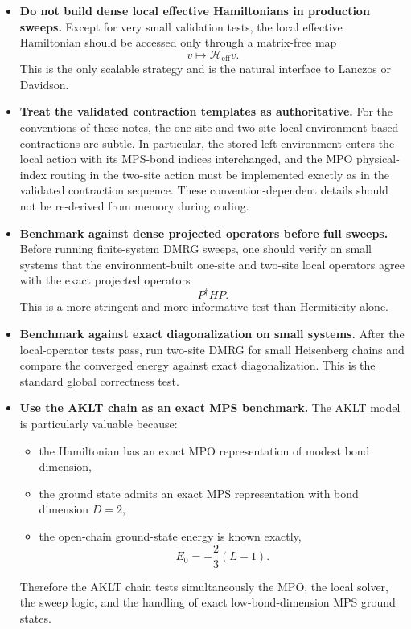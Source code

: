 \documentclass[aps,prb,onecolumn,nofootinbib]{revtex4-2}
\begin{document}
\begin{itemize}
		\item \textbf{Do not build dense local effective Hamiltonians in production sweeps.}
		Except for very small validation tests, the local effective Hamiltonian should be accessed only
		through a matrix-free map
		\[
		v \mapsto \mathcal{H}_{\mathrm{eff}} v.
		\]
		This is the only scalable strategy and is the natural interface to Lanczos or Davidson.
		
		\item \textbf{Treat the validated contraction templates as authoritative.}
		For the conventions of these notes, the one-site and two-site local environment-based
		contractions are subtle. In particular, the stored left environment enters the local action
		with its MPS-bond indices interchanged, and the MPO physical-index routing in the two-site
		action must be implemented exactly as in the validated contraction sequence.
		These convention-dependent details should not be re-derived from memory during coding.
		
		\item \textbf{Benchmark against dense projected operators before full sweeps.}
		Before running finite-system DMRG sweeps, one should verify on small systems that the
		environment-built one-site and two-site local operators agree with the exact projected operators
		\[
		P^\dagger H P.
		\]
		This is a more stringent and more informative test than Hermiticity alone.
		
		\item \textbf{Benchmark against exact diagonalization on small systems.}
		After the local-operator tests pass, run two-site DMRG for small Heisenberg chains and compare
		the converged energy against exact diagonalization. This is the standard global correctness test.
		
		\item \textbf{Use the AKLT chain as an exact MPS benchmark.}
		The AKLT model is particularly valuable because:
		\begin{itemize}
			\item the Hamiltonian has an exact MPO representation of modest bond dimension,
			\item the ground state admits an exact MPS representation with bond dimension $D=2$,
			\item the open-chain ground-state energy is known exactly,
			\[
			E_0 = -\frac23 (L-1).
			\]
		\end{itemize}
		Therefore the AKLT chain tests simultaneously the MPO, the local solver, the sweep logic,
		and the handling of exact low-bond-dimension MPS ground states.
		

\end{itemize}
\end{document}

